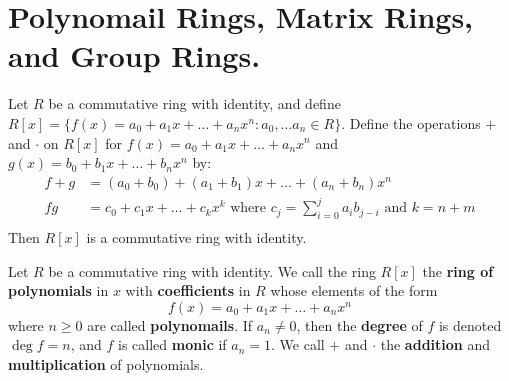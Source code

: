 
\section{Polynomail Rings, Matrix Rings, and Group Rings.}
\label{section1}

\begin{theorem}\label{1.2.1}
    Let $R$ be a commutative ring with identity, and define $R[x]=
    \{f(x)=a_0+a_1x+\dots+a_nx^n : a_0, \dots a_n \in R\}$. Define the
    operations $+$ and  $\cdot$ on $R[x]$ for $f(x)=a_0+a_1x+\dots+a_nx^n$ and
    $g(x)=b_0+b_1x+\dots+b_nx^n$ by:
    \begin{align*}
        f+g &=  (a_0+b_0)+(a_1+b_1)x+\dots+(a_n+b_n)x^n \\
        fg  &=  c_0+c_1x+\dots+c_kx^k \text{ where }
        c_j=\sum_{i=0}^j{a_ib_{j-i}} \text{ and } k=n+m  \\
    \end{align*}
    Then $R[x]$ is a commutative ring with identity.
\end{theorem}

\begin{definition}
    Let $R$ be a commutative ring with identity. We call the ring $R[x]$ the
    \textbf{ring of polynomials} in $x$ with \textbf{coefficients} in $R$ whose
    elements of the form
    \begin{equation*}
        f(x)=a_0+a_1x+\dots+a_nx^n
    \end{equation*}
    where $n \geq 0$ are called \textbf{polynomails}. If $a_n \neq 0$, then the
     \textbf{degree} of $f$ is  denoted $\deg{f}=n$, and $f$ is called
     \textbf{monic} if $a_n=1$. We call $+$ and $\cdot$ the  \textbf{addition}
     and \textbf{multiplication} of polynomials.
\end{definition}

